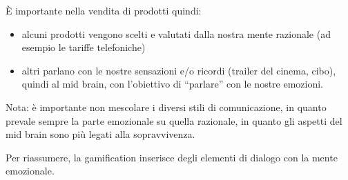 È importante nella vendita di prodotti quindi:
\begin{itemize}
 \item alcuni prodotti vengono scelti e valutati dalla nostra mente razionale
(ad esempio le tariffe telefoniche)
 \item altri parlano con le nostre sensazioni e/o ricordi (trailer del cinema,
cibo), quindi al mid brain, con l'obiettivo di ``parlare'' con le nostre
emozioni.
\end{itemize}

Nota: è importante non mescolare i diversi stili di comunicazione, in quanto
prevale sempre la parte emozionale su quella razionale, in quanto gli aspetti
del mid brain sono più legati alla sopravvivenza.

Per riassumere, la gamification inserisce degli elementi di dialogo
con la mente emozionale.
